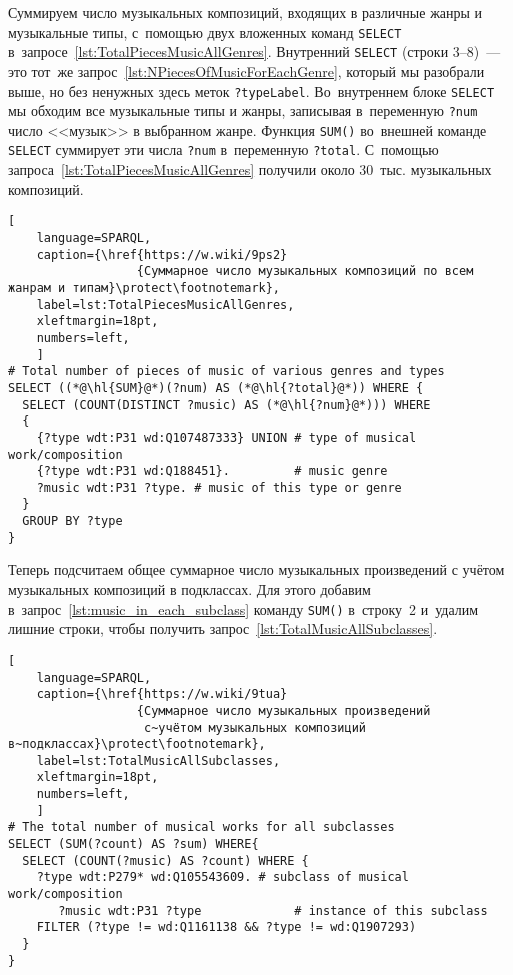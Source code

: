 Суммируем число музыкальных композиций, входящих в различные жанры и музыкальные типы, 
с~помощью двух вложенных команд \lstinline|SELECT| в~запросе~\ref{lst:TotalPiecesMusicAllGenres}. 
% 
Внутренний \lstinline|SELECT| (строки 3--8)~--- это тот~же запрос~\ref{lst:NPiecesOfMusicForEachGenre}, 
который мы разобрали выше, но без ненужных здесь меток \lstinline|?typeLabel|. 
Во~внутреннем блоке \lstinline|SELECT| мы обходим все музыкальные типы и жанры, 
записывая в~переменную \lstinline|?num| число <<музык>> в выбранном жанре. 
% 
Функция \lstinline|SUM()| во~внешней команде \lstinline|SELECT| 
суммирует эти числа \lstinline|?num| в~переменную \lstinline|?total|. 
С~помощью запроса~\ref{lst:TotalPiecesMusicAllGenres} получили около 30~тыс. музыкальных композиций.


\newpage
\begin{lstlisting}[ 
    language=SPARQL,
    caption={\href{https://w.wiki/9ps2}
                  {Суммарное число музыкальных композиций по всем жанрам и типам}\protect\footnotemark},
    label=lst:TotalPiecesMusicAllGenres,
    xleftmargin=18pt,
    numbers=left,
    ]
# Total number of pieces of music of various genres and types
SELECT ((*@\hl{SUM}@*)(?num) AS (*@\hl{?total}@*)) WHERE {
  SELECT (COUNT(DISTINCT ?music) AS (*@\hl{?num}@*))) WHERE
  {                
    {?type wdt:P31 wd:Q107487333} UNION # type of musical work/composition
    {?type wdt:P31 wd:Q188451}.         # music genre
    ?music wdt:P31 ?type. # music of this type or genre
  }
  GROUP BY ?type
}
\end{lstlisting}%


Теперь подсчитаем общее суммарное число музыкальных произведений с учётом музыкальных композиций в подклассах. 
Для этого добавим в~запрос~\ref{lst:music_in_each_subclass} команду \lstinline|SUM()| в~строку~2 
и~удалим лишние строки, чтобы получить запрос~\ref{lst:TotalMusicAllSubclasses}.


\begin{lstlisting}[ 
    language=SPARQL,
    caption={\href{https://w.wiki/9tua}
                  {Суммарное число музыкальных произведений 
                   с~учётом музыкальных композиций в~подклассах}\protect\footnotemark},
    label=lst:TotalMusicAllSubclasses,
    xleftmargin=18pt,
    numbers=left,
    ]
# The total number of musical works for all subclasses 
SELECT (SUM(?count) AS ?sum) WHERE{
  SELECT (COUNT(?music) AS ?count) WHERE {               
    ?type wdt:P279* wd:Q105543609. # subclass of musical work/composition
       ?music wdt:P31 ?type		        # instance of this subclass
	FILTER (?type != wd:Q1161138 && ?type != wd:Q1907293)
  }       
}
\end{lstlisting}%

